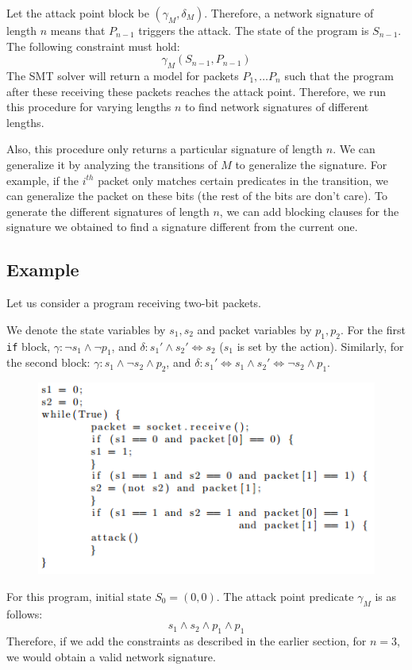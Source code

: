\documentclass[twocolumn, 11pt]{paper}
\begin{document}
Let the attack point block be $(\gamma_M, \delta_M)$. 
Therefore, a network signature of length $n$ means
that $P_{n-1}$ triggers the attack. The state of the program
is $S_{n-1}$. The following constraint must hold:
\begin{equation}
\gamma_M(S_{n-1},P_{n-1})
\end{equation}
The SMT solver will return a model for packets $P_1,
\ldots P_n$ such that the program after these receiving
these packets reaches the attack point. Therefore, 
we run this procedure for varying lengths $n$ to find
network signatures of different lengths.

Also, this procedure only returns a particular signature
of length $n$. We can generalize it by analyzing the 
transitions of $M$ to generalize the signature. For
example, if the $i^{th}$ packet only matches certain 
predicates in the transition, we can generalize the packet on
these bits (the rest of the bits are don't care). To 
generate the different signatures of length $n$, 
we can add blocking clauses for the signature we obtained 
to find a signature different from the current one.
\subsection{Example}
Let us consider a program receiving two-bit packets.

We denote the state variables by $s_1, s_2$ and packet 
variables by $p_1, p_2$.
For the first \texttt{if} block, 
$\gamma: \neg s_1 \wedge \neg p_1$, and $\delta: s_1' \wedge s_2' \Leftrightarrow s_2$ ($s_1$ 
is set by the action). Similarly,
for the second block: 
$\gamma: s_1 \wedge \neg s_2 \wedge p_2$, and $\delta: 
s_1'\Leftrightarrow s_1 \wedge s_2' \Leftrightarrow \neg s_2 \wedge p_1$.
\begin{figure}[ht]
	\includegraphics[width=\columnwidth]{code7.PNG}
	\label{fig:code7}
\end{figure}
For this program, initial state $S_0 = (0, 0)$.
The attack point predicate $\gamma_M$ is as follows:
\begin{equation}
s_1 \wedge s_2 \wedge p_1 \wedge p_1
\end{equation}
Therefore, if we add the constraints as described in the 
earlier section, for $n=3$, we would obtain a
valid network signature. 
\end{document}

